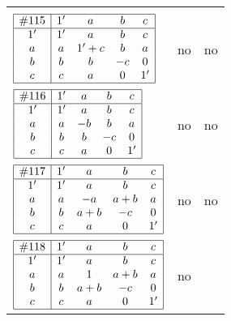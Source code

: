 \documentclass[12pt]{article}
\theoremstyle{definition}
\newcommand{\join}{\mathbin{+}}%
\newcommand{\id}{{1'}}%
\renewcommand{\top}{1}%
\begin{document}
\begin{center}
\begin{longtable}{l|c|c}
{\begin{tikzpicture}[<->,shorten <=1pt,shorten >=1pt,label distance=0mm, font=\small]
\end{tikzpicture}
}      \\[15mm]

$
\begin{array}{|c|cccc|} \hline
\#115 & \id & a & b & c \\ \hline
\id & \id & a & b & c \\
a & a & \id \join c & b & a \\
b & b & b & -c & 0 \\
c & c & a & 0 & \id \\ \hline
\end{array}
$
 & no  
 & no      \\[15mm]

$
\begin{array}{|c|cccc|} \hline
\#116 & \id & a & b & c \\ \hline
\id & \id & a & b & c \\
a & a & -b & b & a \\
b & b & b & -c & 0 \\
c & c & a & 0 & \id \\ \hline
\end{array}
$
 & no  
 & no      \\[15mm]

$
\begin{array}{|c|cccc|} \hline
\#117 & \id & a & b & c \\ \hline
\id & \id & a & b & c \\
a & a & -a & a \join b & a \\
b & b & a \join b & -c & 0 \\
c & c & a & 0 & \id \\ \hline
\end{array}
$
 & no  
 & no      \\[15mm]

$
\begin{array}{|c|cccc|} \hline
\#118 & \id & a & b & c \\ \hline
\id & \id & a & b & c \\
a & a & \top & a \join b & a \\
b & b & a \join b & -c & 0 \\
c & c & a & 0 & \id \\ \hline
\end{array}
$
 & no  
 & \adjustbox{valign=c, max height=1.6cm}{$
\left[ \begin{array}{cccccc}
\id & a & a & b & a & b \\ 
a & \id & a & a & c & a \\ 
a & a & \id & b & a & b \\ 
b & a & b & \id & a & b \\ 
a & c & a & a & \id & a \\ 
b & a & b & b & a & \id
\end{array}\right]
$}     \\[15mm]


\end{longtable}
\end{center}
\end{document}
